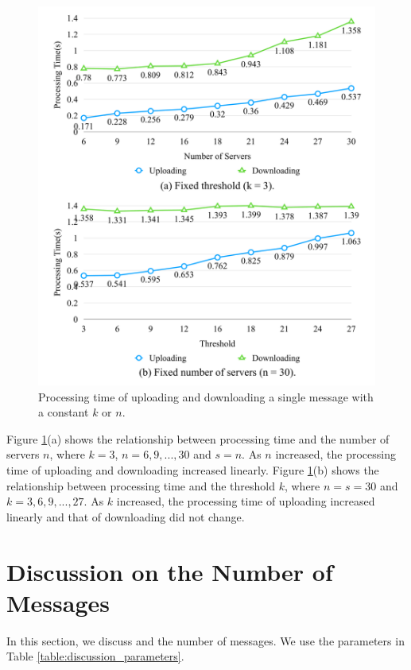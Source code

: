 \documentclass[a4paper,11pt]{report}
\begin{document}
\begin{figure}[t]
	\centering
	\includegraphics[scale=0.15]{constant_k_n}
	\caption{Processing time of uploading and downloading a single message with a constant ${k}$ or ${n}$.}
	\label{fig:processing_time_constant_k_n}
\end{figure}

Figure \ref{fig:processing_time_constant_k_n}(a) shows the relationship between processing time and the number of servers ${n}$, where ${k=3}$,  ${n = 6, 9, ... , 30}$ and $s = n$.
As $n$ increased, the processing time of uploading and downloading increased linearly. 
Figure \ref{fig:processing_time_constant_k_n}(b) shows the relationship between processing time and the threshold ${k}$, where ${n = s =30}$ and ${k = 3, 6, 9, ... , 27}$.
As $k$ increased, the processing time of uploading increased linearly and that of downloading did not change.

\section{Discussion on the Number of Messages} \label{section:discussion}

In this section, we discuss and the number of messages. 
We use the parameters in Table \ref{table:discussion_parameters}.
\end{document}

